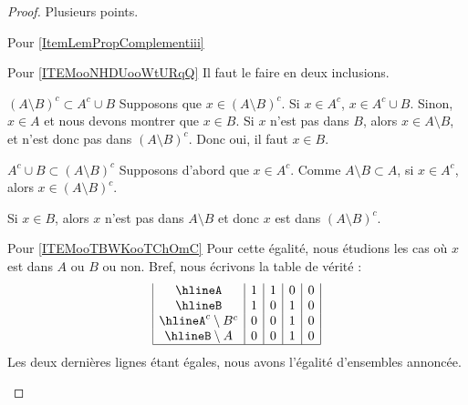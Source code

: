 \begin{proof}
    Plusieurs points.
    \begin{subproof}
    \item[Pour \ref{ItemLemPropComplementiii}]
    \item[Pour \ref{ITEMooNHDUooWtURqQ}]
        Il faut le faire en deux inclusions.
        \begin{subproof}
        \item[\( (A\setminus B)^c\subset A^c\cup B\)]
            Supposons que \( x\in(A\setminus B)^c\). Si \( x\in A^c\), \( x\in A^c\cup B\). Sinon, \( x\in A\) et nous devons montrer que \( x\in B\). Si \( x\) n'est pas dans \( B\), alors \( x\in A\setminus B\), et n'est donc pas dans \( (A\setminus B)^c\). Donc oui, il faut \( x\in B\).
        \item[\( A^c\cup B\subset (A\setminus B)^c\)]
            Supposons d'abord que \( x\in A^c\). Comme \( A\setminus B\subset A\), si \( x\in A^c\), alors \( x\in (A\setminus B)^c\).

            Si \( x\in B\), alors \( x\) n'est pas dans \( A\setminus B\) et donc \( x\) est dans \( (A\setminus B)^c\).
        \end{subproof}
    \item[Pour \ref{ITEMooTBWKooTChOmC}]
        Pour cette égalité, nous étudions les cas où \( x\) est dans \( A\) ou \( B\) ou non. Bref, nous écrivons la table de vérité :
\begin{equation}       
    \begin{array}{|c|c|c|c|c|}
        \hline%
        A   &   1   & 1 & 0 & 0\\
        \hline%
        B&1&0&1&0\\
        \hline%
        A^c\setminus B^c & 0 & 0 &1&0\\
        \hline%
        B\setminus A & 0 & 0 &1&0\\
        \hline%
    \end{array}
\end{equation}
Les deux dernières lignes étant égales, nous avons l'égalité d'ensembles annoncée.
    \end{subproof}
\end{proof}

